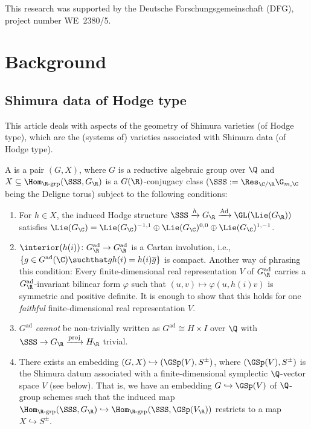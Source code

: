 \documentclass[a4paper]{scrartcl} %
\numberwithin{equation}{section}
\begin{document}
This research was supported by the Deutsche Forschungsgemeinschaft (DFG), project number WE~2380/5.







\section{Background}
\label{cha:gener-prel}



\subsection{Shimura data of Hodge type}
\label{sec:shimura-data-hodge}


This article deals with aspects of the geometry of Shimura varieties (of Hodge type), which are the (systems of) varieties associated with Shimura data (of Hodge type).

\begin{Definition}\label{def-hodget}
  A  is a pair $(G,X)$, where $G$ is a reductive algebraic group over $\Q$ and $X\subseteq\Hom_{\R\text{-grp}}(\SSS,G_\R)$ is a $G(\R)$-conjugacy class ($\SSS:=\Res_{\C/\R}\G_{m,\C}$ being the Deligne torus) subject to the following conditions:
\begin{enumerate}[(1)]
\item For $h\in X$, the induced Hodge structure $\SSS\xrightarrow{h} G_\R \xrightarrow{\mathrm{Ad}}\GL(\Lie(G_\R))$ satisfies $\Lie(G_\C)=\Lie(G_\C)^{-1,1}\oplus\Lie(G_\C)^{0,0}\oplus\Lie(G_\C)^{1,-1}$.\label{sv1}
\item $\interior(h(i))\colon G^\mathrm{ad}_\R\to G^\mathrm{ad}_\R$ is a Cartan involution, i.e., $\{ g\in G^\mathrm{ad}(\C)\suchthat gh(i) = h(i)\overline{g}\}$ is compact. Another way of phrasing this condition: Every finite-dimensional real representation $V$ of $G^\mathrm{ad}_\R$ carries a $G^\mathrm{ad}_\R$-invariant bilinear form $\varphi$ such that $(u,v)\mapsto \varphi(u,h(i)v)$ is symmetric and positive definite. It is enough to show that this holds for one \emph{faithful} finite-dimensional real representation $V$.
\item $G^\mathrm{ad}$ \emph{cannot} be non-trivially written as $G^\mathrm{ad}\cong H\times I$ over $\Q$ with $\SSS\to G_\R \xrightarrow{\mathrm{proj}} H_\R$ trivial.
\item There exists an embedding $(G,X)\hookrightarrow (\GSp(V),S^\pm)$, where $(\GSp(V),S^\pm)$ is the Shimura datum associated with a finite-dimensional symplectic $\Q$-vector space $V$ (see below). That is, we have an embedding $G\hookrightarrow \GSp(V)$ of $\Q$-group schemes such that the induced map $\Hom_{\R\text{-grp}}(\SSS,G_\R)\hookrightarrow\Hom_{\R\text{-grp}}(\SSS,\GSp(V_\R))$ restricts to a map $X\hookrightarrow S^\pm$. \label{item:def-hodget-hodge-emb}
\end{enumerate}
\end{Definition}
\end{document}
